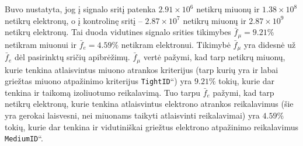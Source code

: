\documentclass[a4paper, 12pt, oneside]{article}
\newcommand{\ttt}[1]{\texttt{#1}}
\newcommand{\ltq}[1]{{\quotedblbase{}#1\textquotedblleft{}}}
\newlength\q
\begin{document}
Buvo nustatyta, jog į signalo sritį patenka $2.91\!\times\!10^6$ netikrų miuonų ir $1.38\!\times\!10^8$ netikrų elektronų,
o į kontrolinę sritį -- $2.87\!\times\!10^7$ netikrų miuonų ir $2.87\times10^9$ netikrų elektronų.
Tai duoda vidutines signalo srities tikimybes $\bar{f}_{\mu}=9.21\%$ netikram miuonui ir $\bar{f}_{e}=4.59\%$ netikram elektronui.
Tikimybė $\bar{f}_{\mu}$ yra didesnė už $\bar{f}_{e}$ dėl pasirinktų sričių apibrėžimų.
$\bar{f}_{\mu}$ vertė pažymi, kad tarp netikrų miuonų, kurie tenkina atlaisvintus miuono atrankos kriterijus (tarp kurių yra ir
labai griežtas miuono atpažinimo kriterijus \ltq{\ttt{TightID}}) yra $9.21\%$ tokių, kurie dar tenkina ir taikomą izoliuotumo reikalavimą.
Tuo tarpu $\bar{f}_{e}$ pažymi, kad tarp netikrų elektronų, kurie tenkina atlaisvintus elektrono atrankos reikalavimus
(šie yra gerokai laisvesni, nei miuonams taikyti atlaisvinti reikalavimai) yra $4.59\%$ tokių, kurie dar tenkina ir vidutiniškai
griežtus elektrono atpažinimo reikalavimus \ltq{\ttt{MediumID}}.
\end{document}
